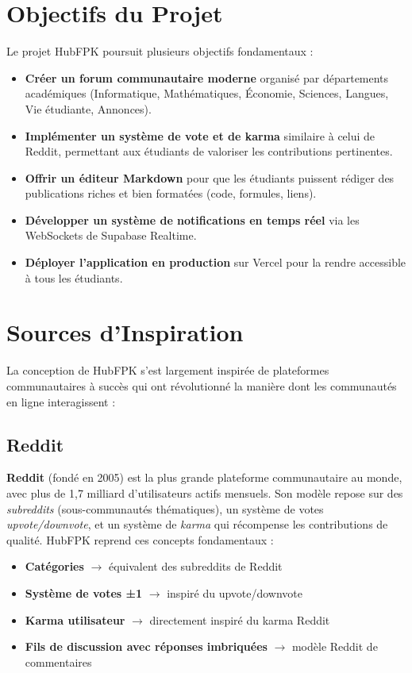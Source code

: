 \documentclass[12pt, a4paper]{report}
\begin{document}
\section{Objectifs du Projet}

Le projet HubFPK poursuit plusieurs objectifs fondamentaux :

\begin{itemize}[leftmargin=2cm]
    \item[\textbf{1.}] \textbf{Créer un forum communautaire moderne} organisé par départements académiques (Informatique, Mathématiques, Économie, Sciences, Langues, Vie étudiante, Annonces).
    \item[\textbf{2.}] \textbf{Implémenter un système de vote et de karma} similaire à celui de Reddit, permettant aux étudiants de valoriser les contributions pertinentes.
    \item[\textbf{3.}] \textbf{Offrir un éditeur Markdown} pour que les étudiants puissent rédiger des publications riches et bien formatées (code, formules, liens).
    \item[\textbf{4.}] \textbf{Développer un système de notifications en temps réel} via les WebSockets de Supabase Realtime.
    \item[\textbf{5.}] \textbf{Déployer l'application en production} sur Vercel pour la rendre accessible à tous les étudiants.
\end{itemize}

\section{Sources d'Inspiration}

La conception de HubFPK s'est largement inspirée de plateformes communautaires à succès qui ont révolutionné la manière dont les communautés en ligne interagissent :

\subsection{Reddit}

\textbf{Reddit} (fondé en 2005) est la plus grande plateforme communautaire au monde, avec plus de 1,7 milliard d'utilisateurs actifs mensuels. Son modèle repose sur des \textit{subreddits} (sous-communautés thématiques), un système de votes \textit{upvote/downvote}, et un système de \textit{karma} qui récompense les contributions de qualité. HubFPK reprend ces concepts fondamentaux :

\begin{itemize}
    \item \textbf{Catégories} $\rightarrow$ équivalent des subreddits de Reddit
    \item \textbf{Système de votes ±1} $\rightarrow$ inspiré du upvote/downvote
    \item \textbf{Karma utilisateur} $\rightarrow$ directement inspiré du karma Reddit
    \item \textbf{Fils de discussion avec réponses imbriquées} $\rightarrow$ modèle Reddit de commentaires
\end{itemize}
\end{document}
